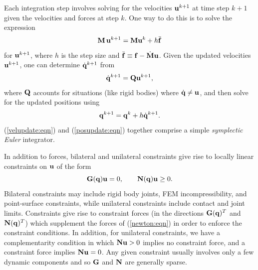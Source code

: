 Each integration step involves solving for
the velocities ${\bf u}^{k+1}$ at time step $k+1$ given the velocities and forces
at step $k$. One way to do this is to solve the expression
%
\begin{equation}
{\bf M} \, {\bf u}^{k+1} = {\bf M} {\bf u}^k + h \bar{{\bf f}}
\label{velupdate:eqn}
\end{equation}
%
for ${\bf u}^{k+1}$, where $h$ is the step size and 
$\bar{{\bf f}} \equiv {\bf f} - \dot{{\bf M}} {\bf u}$. Given the updated velocities ${\bf u}^{k+1}$, one can
determine $\dot{{\bf q}}^{k+1}$ from
%
\begin{equation}
\dot{{\bf q}}^{k+1} = {\bf Q} {\bf u}^{k+1},
\end{equation}
%
where ${\bf Q}$ accounts for situations (like rigid bodies) where $\dot{{\bf q}} \ne
{\bf u}$, and then solve for the updated positions using 
%
\begin{equation}
{\bf q}^{k+1} = {\bf q}^k + h \dot {{\bf q}}^{k+1}.
\label{posupdate:eqn}
\end{equation}
%
(\ref{velupdate:eqn}) and (\ref{posupdate:eqn}) together comprise a
simple {\it symplectic Euler} integrator.

In addition to forces, bilateral and unilateral constraints give rise to
locally linear constraints on ${\bf u}$ of the form
\begin{equation}
{\bf G}({\bf q}) {\bf u} = 0, \qquad {\bf N}({\bf q}) {\bf u} \ge 0.
\label{constraints:eqn}
\end{equation}
%
Bilateral constraints may include rigid body joints, FEM
incompressibility, and point-surface constraints, while unilateral
constraints include contact and joint limits.  Constraints give rise
to constraint forces (in the directions ${\bf G}({\bf q})^T$ and ${\bf N}({\bf q})^T$)
which supplement the forces of (\ref{newton:eqn}) in order to enforce
the constraint conditions.  In addition, for unilateral constraints,
we have a complementarity condition in which ${\bf N} {\bf u} > 0$ implies no
constraint force, and a constraint force implies ${\bf N} {\bf u} = 0$.  Any
given constraint usually involves only a few dynamic components and so
${\bf G}$ and ${\bf N}$ are generally sparse.

